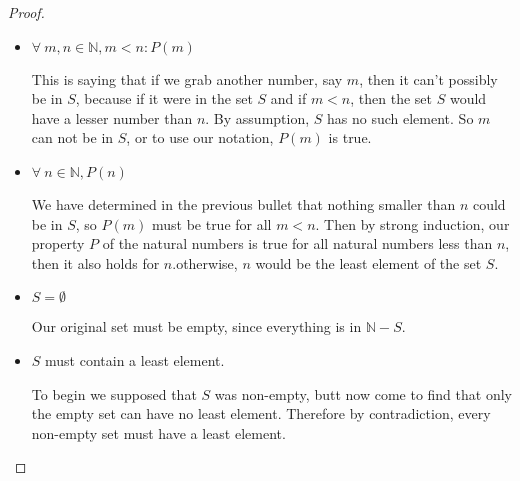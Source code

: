 \begin{theorem}
\begin{proof}
\begin{itemize}
\item \begin{minipage}[t]{0.3\textwidth}$\forall~m, n\in \mathbb{N}, m<n : P(m)$
\end{minipage}
\hfill\begin{minipage}[t]{0.6\textwidth} This is saying that if we grab another number, say $m$, then it can't possibly be in $S$, because if it were in the set $S$ and if $m<n$, then the set $S$ would have a lesser number than $n$.  By assumption, $S$ has no such element. So $m$ can not be in $S$, or to use our notation, $P(m)$ is true.
\end{minipage}

\item \begin{minipage}[t]{0.3\textwidth}$\forall ~ n\in\mathbb{N}, P(n)$
\end{minipage}
\hfill\begin{minipage}[t]{0.6\textwidth}We have determined in the previous bullet that nothing smaller than $n$ could be in $S$, so $P(m)$ must be true for all $m<n$.  Then by strong induction, our property $P$ of the natural numbers is true for all natural numbers less than $n$, then it also holds for $n$.otherwise, $n$ would be the least element of the set $S$.
\end{minipage}
  
\item \begin{minipage}[t]{0.3\textwidth}$S=\emptyset$
\end{minipage}
\hfill\begin{minipage}[t]{0.6\textwidth}Our original set must be empty, since everything is in $\mathbb{N}-S$.
\end{minipage}

  
\item \begin{minipage}[t]{0.3\textwidth}$S$  must contain a least element.
\end{minipage}
\hfill\begin{minipage}[t]{0.6\textwidth}To begin we supposed that $S$ was non-empty, butt now come to find that only the empty set can have no least element. Therefore by contradiction, every non-empty set must have a least element.
\end{minipage}
\end{itemize}
\end{proof}

\end{theorem}

